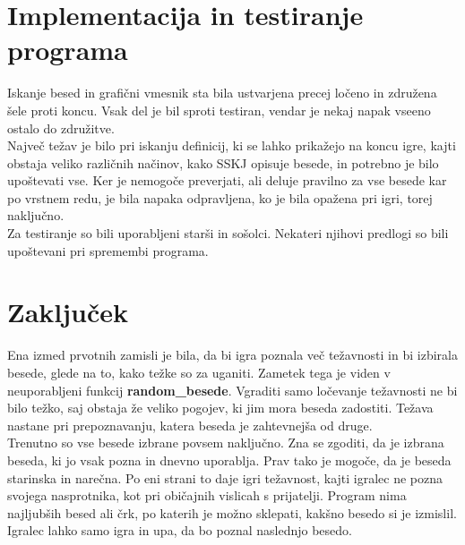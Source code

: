 \documentclass [a4paper, 12pt] {article}
\begin{document}
\section {Implementacija in testiranje programa}
Iskanje besed in grafični vmesnik sta bila ustvarjena precej ločeno in združena šele proti koncu. Vsak del je bil sproti testiran, vendar je nekaj napak vseeno ostalo do združitve. \\
Največ težav je bilo pri iskanju definicij, ki se lahko prikažejo na koncu igre, kajti obstaja veliko različnih načinov, kako SSKJ opisuje besede, in potrebno je bilo upoštevati vse. Ker je nemogoče preverjati, ali deluje pravilno za vse besede kar po vrstnem redu, je bila napaka odpravljena, ko je bila opažena pri igri, torej naključno. \\
Za testiranje so bili uporabljeni starši in sošolci. Nekateri njihovi predlogi so bili upoštevani pri spremembi programa.

\section {Zaključek}
Ena izmed prvotnih zamisli je bila, da bi igra poznala več težavnosti in bi izbirala besede, glede na to, kako težke so za uganiti. Zametek tega je viden v neuporabljeni funkcij \textbf {random\_besede}. Vgraditi samo ločevanje težavnosti ne bi bilo težko, saj obstaja že veliko pogojev, ki jim mora beseda zadostiti. Težava nastane pri prepoznavanju, katera beseda je zahtevnejša od druge. \\
Trenutno so vse besede izbrane povsem naključno. Zna se zgoditi, da je izbrana beseda, ki jo vsak pozna in dnevno uporablja. Prav tako je mogoče, da je beseda starinska in narečna. Po eni strani to daje igri težavnost, kajti igralec ne pozna svojega nasprotnika, kot pri običajnih vislicah s prijatelji. Program nima najljubših besed ali črk, po katerih je možno sklepati, kakšno besedo si je izmislil. Igralec lahko samo igra in upa, da bo poznal naslednjo besedo. 
\end{document}

